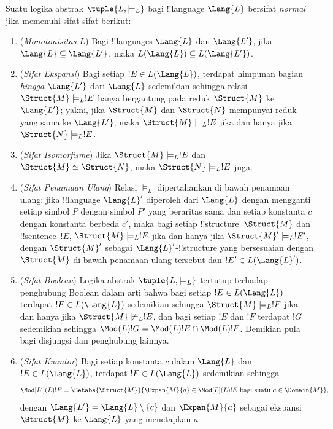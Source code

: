 \documentclass[../../../include/open-logic-section]{subfiles}
\begin{document}
\begin{defn}
Suatu logika abstrak $\tuple{L,\models_L}$ bagi !!{language} $\Lang{L}$
bersifat \emph{normal} jika memenuhi sifat-sifat berikut:
\begin{enumerate}
\item (\emph{Monotonisitas-$L$}) Bagi !!{language}s $\Lang{L}$ dan
  $\Lang{L'}$, jika $\Lang{L} \subseteq \Lang{L'}$, maka
  $L(\Lang{L}) \subseteq L(\Lang{L'})$.
\item (\emph{Sifat Ekspansi}) Bagi setiap $!E \in L(\Lang{L})$, terdapat
  himpunan bagian \emph{hingga} $\Lang{L'}$ dari $\Lang{L}$ sedemikian
  sehingga relasi $\Struct{M} \models_L !E$ hanya bergantung pada reduk
  $\Struct{M}$ ke $\Lang{L'}$; yakni, jika $\Struct{M}$ dan $\Struct{N}$
  mempunyai reduk yang sama ke $\Lang{L'}$, maka $\Struct{M} \models_L !E$
  jika dan hanya jika $\Struct{N} \models_L !E$.
\item (\emph{Sifat Isomorfisme}) Jika $\Struct{M} \models_L !E$ dan
  $\Struct{M} \simeq \Struct{N}$, maka $\Struct{N} \models_L !E$ juga.
\item (\emph{Sifat Penamaan Ulang}) Relasi $\models_L$ dipertahankan di
  bawah penamaan ulang: jika !!{language} $\Lang{L}'$ diperoleh dari
  $\Lang{L}$ dengan mengganti setiap simbol $P$ dengan simbol $P'$ yang
  beraritas sama dan setiap konstanta $c$ dengan konstanta berbeda $c'$,
  maka bagi setiap !!{structure}~$\Struct{M}$ dan !!{sentence}~$!E$,
  $\Struct{M} \models_L !E$ jika dan hanya jika $\Struct{M}' \models_L
  !E'$, dengan $\Struct{M}'$ sebagai $\Lang{L}'$-!!{structure} yang
  bersesuaian dengan $\Struct{M}$ di bawah penamaan ulang tersebut dan
  $!E' \in L(\Lang{L}')$.
\item (\emph{Sifat Boolean}) Logika abstrak $\tuple{L, \models_L}$ tertutup
  terhadap penghubung Boolean dalam arti bahwa bagi setiap $!E \in
  L(\Lang{L})$ terdapat $!F \in L(\Lang{L})$ sedemikian sehingga
  $\Struct{M} \models_L !F$ jika dan hanya jika $\Struct{M} \not\models_L
  !E$, dan bagi setiap $!E$ dan $!F$ terdapat $!G$ sedemikian sehingga
  $\Mod(L){!G} = \Mod(L){!E} \cap \Mod(L){!F}$. Demikian pula bagi
  disjungsi dan penghubung lainnya.
\item (\emph{Sifat Kuantor}) Bagi setiap konstanta $c$ dalam $\Lang{L}$ dan
  $!E \in L(\Lang{L})$, terdapat $!F \in L(\Lang{L})$ sedemikian sehingga
  \[
  \Mod[L'](L){!F} = \Setabs{\Struct{M}}{\Expan{M}{a} \in
  \Mod[L](L){!E} \text{ bagi suatu } a \in \Domain{M}},
  \]
  dengan $\Lang{L'} = \Lang{L} \setminus \{c\}$ dan $\Expan{M}{a}$
  sebagai ekspansi $\Struct{M}$ ke $\Lang{L}$ yang menetapkan $a$

\end{enumerate}
\end{defn}
\end{document}
